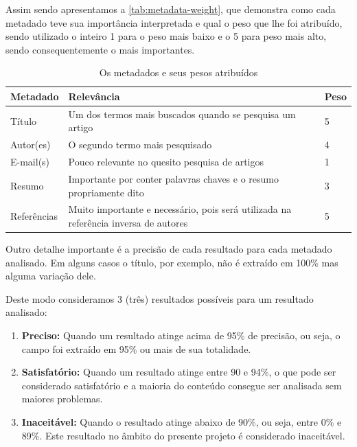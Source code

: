 Assim sendo apresentamos a \autoref{tab:metadata-weight}, que demonstra como cada metadado teve sua importância interpretada e qual o peso que lhe foi atribuído, sendo utilizado o inteiro 1 para o peso mais baixo e o 5 para peso mais alto, sendo consequentemente o mais importantes.


\begin{table}
    \caption{Os metadados e seus pesos atribuídos}
    \begin{center}
        \begin{tabular}{|p{3cm}|p{8cm}|C{1cm}|}
            \hline \textbf{Metadado} & \textbf{Relevância} & \textbf{Peso} \\ 
            \hline Título & Um dos termos mais buscados quando se pesquisa um artigo & 5 \\
            \hline Autor(es) & O segundo termo mais pesquisado & 4 \\
            \hline E-mail(s) & Pouco relevante no quesito pesquisa de artigos & 1 \\
            \hline Resumo & Importante por conter palavras chaves e o resumo propriamente dito & 3 \\
            \hline Referências & Muito importante e necessário, pois será utilizada na referência inversa de autores & 5 \\
            \hline 
        \end{tabular} 
    \end{center}
    \label{tab:metadata-weight}
\end{table}


Outro detalhe importante é a precisão de cada resultado para cada metadado analisado. Em alguns casos o título, por exemplo, não é extraído em 100\% mas alguma variação dele. 

Deste modo consideramos 3 (três) resultados possíveis para um resultado analisado:

\begin{enumerate}
    \item \textbf{Preciso:} Quando um resultado atinge acima de 95\% de precisão, ou seja, o campo foi extraído em 95\% ou mais de sua totalidade.
    \item \textbf{Satisfatório:} Quando um resultado atinge entre 90 e 94\%, o que pode ser considerado satisfatório e a maioria do conteúdo consegue ser analisada sem maiores problemas.
    \item \textbf{Inaceitável:} Quando o resultado atinge abaixo de 90\%, ou seja, entre 0\% e 89\%. Este resultado no âmbito do presente projeto é considerado inaceitável.
\end{enumerate}

